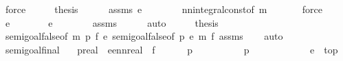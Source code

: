 \begin{isabellebody}
\ force\isanewline
\ \ \isamarkupfalse%
\ \isamarkupfalse%
\ {\isacharquery}{\kern0pt}thesis\isanewline
\ \ \ \ \isamarkupfalse%
\ assms{\isacharparenleft}{\kern0pt}{}{\isacharparenright}{\kern0pt}\ {\isacartoucheopen}e\ {\isacharequal}{\kern0pt}\ {}{\isacartoucheclose}\isanewline
\ \ \ \ \isamarkupfalse%
\ nn{\isacharunderscore}{\kern0pt}integral{\isacharunderscore}{\kern0pt}const{\isacharbrackleft}{\kern0pt}of\ m\ {}{\isacharbrackright}{\kern0pt}\isanewline
\ \ \ \ \isamarkupfalse%
\ force\isanewline
{}\isamarkupfalse%
\ \isanewline
\ \ \isamarkupfalse%
\ {\isachardoublequoteopen}e\ {\isasymnoteq}\ {}{\isachardoublequoteclose}\isanewline
\ \ \isamarkupfalse%
\ \isamarkupfalse%
\ {\isachardoublequoteopen}e\ {\isachargreater}{\kern0pt}\ {}{\isachardoublequoteclose}\isanewline
\ \ \ \ \isamarkupfalse%
\ assms\isanewline
\ \ \ \ \isamarkupfalse%
\ auto\isanewline
\ \ \isamarkupfalse%
\ \isamarkupfalse%
\ {\isacharquery}{\kern0pt}thesis\isanewline
\ \ \isamarkupfalse%
\ semi{\isacharunderscore}{\kern0pt}goal{}{}{\isacharunderscore}{\kern0pt}false{\isacharbrackleft}{\kern0pt}of\ m\ p{}\ f\ e{\isacharbrackright}{\kern0pt}\ semi{\isacharunderscore}{\kern0pt}goal{}{}{\isacharunderscore}{\kern0pt}false{\isacharbrackleft}{\kern0pt}of\ p{}\ e\ m\ f{\isacharbrackright}{\kern0pt}\ assms\isanewline
\ \ \isamarkupfalse%
\ auto\ \ \ \ \ \ \ \ \ \ \isanewline
{}\isamarkupfalse%
%
\endisatagproof
{\isafoldproof}%
%
\isadelimproof
\isanewline
%
\endisadelimproof
\isanewline
\isanewline
{}\isamarkupfalse%
\ semi{\isacharunderscore}{\kern0pt}goal{}{\isacharunderscore}{\kern0pt}final{\isacharcolon}{\kern0pt}\isanewline
\ \ \ p{}{\isacharcolon}{\kern0pt}{\isacharcolon}{\kern0pt}real\ \ e{\isacharcolon}{\kern0pt}{\isacharcolon}{\kern0pt}ennreal\ \ f\isanewline
\ \ \ \ {\isachardoublequoteopen}{}\ {\isasymle}\ p{}{\isachardoublequoteclose}\isanewline
\ \ \ \ \ \ \ \ \ \ {\isachardoublequoteopen}p{}\ {\isasymle}\ {}{\isachardoublequoteclose}\isanewline
\ \ \ \ \ \ \ \ \ \ {\isachardoublequoteopen}e\ {\isasymnoteq}\ top{\isachardoublequoteclose}\isanewline

\end{isabellebody}
